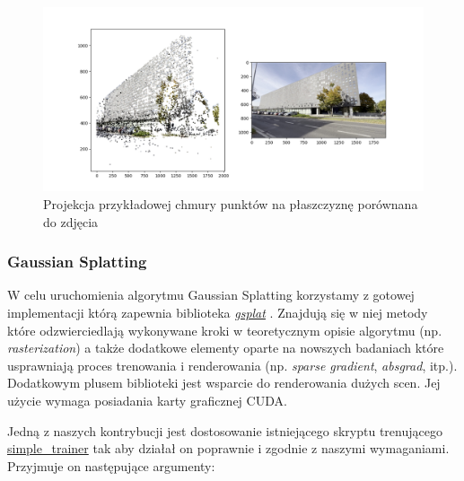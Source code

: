 \begin{figure}[!ht]
  \centering
  \includegraphics[width=0.9\linewidth]{img/sfm_projection.png}
  \caption{Projekcja przykładowej chmury punktów na płaszczyznę porównana do zdjęcia}
\end{figure}

\subsubsection{Gaussian Splatting}
W celu uruchomienia algorytmu Gaussian Splatting korzystamy z gotowej implementacji którą 
zapewnia biblioteka \href{https://docs.gsplat.studio/main/index.html}{\textit{gsplat}} \cite{ye2024gsplatopensourcelibrarygaussian}. Znajdują się w niej metody które odzwierciedlają wykonywane kroki w teoretycznym opisie algorytmu (np. \textit{rasterization}) a także dodatkowe elementy oparte na nowszych badaniach które usprawniają proces trenowania i renderowania (np. \textit{sparse gradient}, \textit{absgrad}, itp.). Dodatkowym plusem biblioteki jest wsparcie do renderowania dużych scen. Jej użycie wymaga posiadania karty graficznej CUDA.  

Jedną z naszych kontrybucji jest dostosowanie istniejącego skryptu trenującego \href{https://github.com/nerfstudio-project/gsplat/blob/main/examples/simple_trainer.py}{simple\_trainer} tak aby działał on poprawnie i zgodnie z naszymi wymaganiami. Przyjmuje on następujące argumenty:

